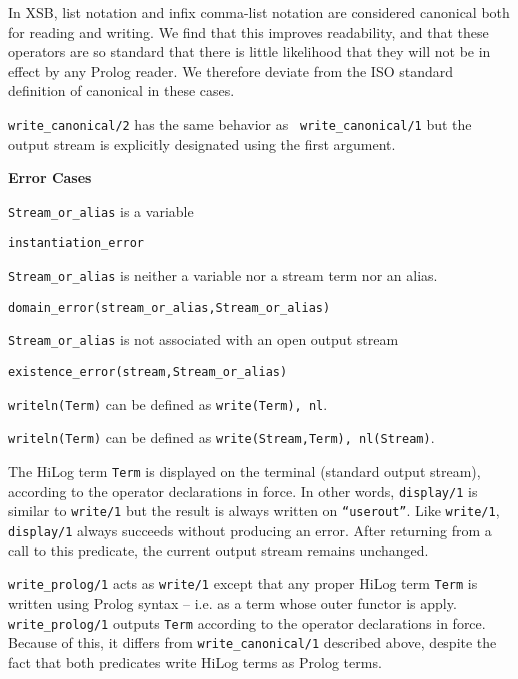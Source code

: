 \begin{description}
\compatability
%
In XSB, list notation and infix comma-list notation are considered
canonical both for reading and writing.  We find that this improves
readability, and that these operators are so standard that there is
little likelihood that they will not be in effect by any Prolog
reader.  We therefore deviate from the ISO standard definition of
canonical in these cases.

%
{\tt write\_canonical/2} has the same behavior as {\tt
write\_canonical/1} but the output stream is explicitly designated
using the first argument.

{\bf Error Cases} 
\bi
\item 	{\tt Stream\_or\_alias} is a variable
\bi
\item {\tt instantiation\_error}
\ei
\item 	{\tt Stream\_or\_alias} is neither a variable nor a stream term nor an alias.
\bi
\item 	{\tt domain\_error(stream\_or\_alias,Stream\_or\_alias)}
\ei
\item 	{\tt Stream\_or\_alias} is not associated with an open output stream
\bi
\item 	{\tt existence\_error(stream,Stream\_or\_alias)}
\ei
\ei

    {\tt writeln(Term)} can be defined as {\tt write(Term), nl}.

    {\tt writeln(Term)} can be defined as {\tt write(Stream,Term),
    nl(Stream)}.

    The HiLog term {\tt Term} is displayed on the terminal (standard output 
    stream), according to the operator declarations in force. In other words,
    {\tt display/1} is similar to {\tt write/1} but the result is always
    written on {\tt ``userout''}\@.  Like {\tt write/1}, {\tt display/1} 
    always succeeds without producing an error. After returning from a call 
    to this predicate, the current output stream remains unchanged.

%
   {\tt write\_prolog/1} acts as {\tt write/1} except that any proper
   HiLog term {\tt Term} is written using Prolog syntax -- i.e. as a
   term whose outer functor is apply.  {\tt write\_prolog/1} outputs
   {\tt Term} according to the operator declarations in force.
   Because of this, it differs from {\tt write\_canonical/1} described
   above, despite the fact that both predicates write HiLog terms as
   Prolog terms.


\end{description}
